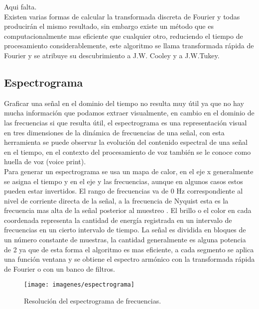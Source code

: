 Aqui falta.\\

Existen varias formas de calcular la transformada discreta de Fourier y todas producir\'an el mismo resultado, sin embargo existe un m\'etodo que es computacionalmente mas eficiente que cualquier otro, reduciendo el tiempo de procesamiento considerablemente, este algoritmo se llama transformada r\'apida de Fourier y se atribuye su descubrimiento a J.W. Cooley y a J.W.Tukey.\\

\subsection{Espectrograma}
Graficar una señal en el dominio del tiempo no resulta muy \'util ya que no hay mucha informaci\'on que podamos extraer visualmente, en cambio en el dominio de las frecuencias si que resulta \'util, el espectrograma es una representaci\'on visual en tres dimensiones de la din\'amica de frecuencias de una señal, con esta herramienta se puede observar la evoluci\'on del contenido espectral de una señal en el tiempo, en el contexto del procesamiento de voz tambi\'en se le conoce como huella de voz (voice print).\\

Para generar un espectrograma se usa un mapa de calor, en el eje x generalmente se asigna el tiempo y en el eje y las frecuencias, aunque en algunos casos estos pueden estar invertidos. El rango de frecuencias va de 0 Hz correspondiente al nivel de corriente directa de la señal, a la frecuencia de Nyquist esta es la frecuencia mas alta de la señal posterior al muestreo \cite{beigi2011}. El brillo o el color en cada coordenada representa la cantidad de energ\'ia registrada en un intervalo de frecuencias en un cierto intervalo de tiempo. La señal es dividida en bloques de un n\'umero constante de muestras, la cantidad generalmente es alguna potencia de 2 ya que de esta forma el algoritmo es mas eficiente, a cada segmento se aplica una funci\'on ventana y se obtiene el espectro arm\'onico con la transformada r\'apida de Fourier o con un banco de filtros.\\ 

\begin{figure}[H]
	\begin{center}
	\texttt{[image: imagenes/espectrograma]} \\
	\caption{Resoluci\'on del espectrograma de frecuencias.}
	\label{fig:diag_recon_locutor}
	\end{center}
\end{figure}

